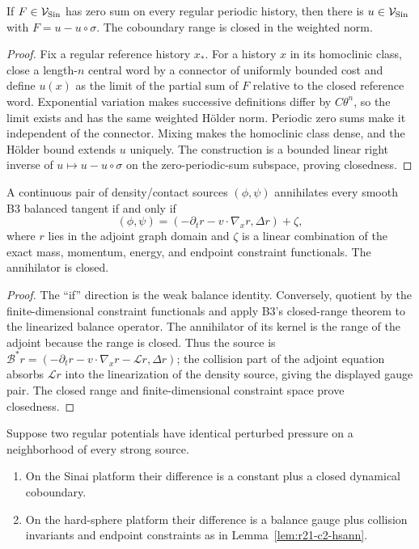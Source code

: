 \begin{lemma}
\label{lem:r21-c2-livsic}
If $F\in\mathcal V_{\rm Sin}$ has zero sum on every regular periodic history,
then there is $u\in\mathcal V_{\rm Sin}$ with
$F=u-u\circ\sigma$.  The coboundary range is closed in the weighted norm.
\end{lemma}

\begin{proof}
Fix a regular reference history $x_*$.  For a history $x$ in its homoclinic
class, close a length-$n$ central word by a connector of uniformly bounded
cost and define $u(x)$ as the limit of the partial sum of $F$ relative to the
closed reference word.  Exponential variation makes successive definitions
differ by $C\theta^n$, so the limit exists and has the same weighted H\"older
norm.  Periodic zero sums make it independent of the connector.  Mixing makes
the homoclinic class dense, and the H\"older bound extends $u$ uniquely.
The construction is a bounded linear right inverse of
$u\mapsto u-u\circ\sigma$ on the zero-periodic-sum subspace, proving closedness.
\end{proof}

\begin{lemma}
\label{lem:r21-c2-hsann}
A continuous pair of density/contact sources $(\phi,\psi)$ annihilates every
smooth B3 balanced tangent if and only if
\[
 (\phi,\psi)=
 (-\partial_tr-v\cdot\nabla_xr,\Delta r)+\zeta,
\]
where $r$ lies in the adjoint graph domain and $\zeta$ is a linear combination
of the exact mass, momentum, energy, and endpoint constraint functionals.
The annihilator is closed.
\end{lemma}

\begin{proof}
The ``if'' direction is the weak balance identity.  Conversely, quotient by
the finite-dimensional constraint functionals and apply B3's closed-range
theorem to the linearized balance operator.  The annihilator of its kernel is
the range of the adjoint because the range is closed.  Thus the source is
$\mathcal B^*r=(-\partial_tr-v\cdot\nabla_xr-\mathcal Lr,\Delta r)$; the
collision part of the adjoint equation absorbs $\mathcal Lr$ into the
linearization of the density source, giving the displayed gauge pair.  The
closed range and finite-dimensional constraint space prove closedness.
\end{proof}

\begin{theorem}
\label{thm:r21-c2-rigidity}
Suppose two regular potentials have identical perturbed pressure on a
neighborhood of every strong source.
\begin{enumerate}[label=(\roman*)]
\item On the Sinai platform their difference is a constant plus a closed
      dynamical coboundary.
\item On the hard-sphere platform their difference is a balance gauge plus
      collision invariants and endpoint constraints as in
      Lemma~\ref{lem:r21-c2-hsann}.
\end{enumerate}
\end{theorem}

